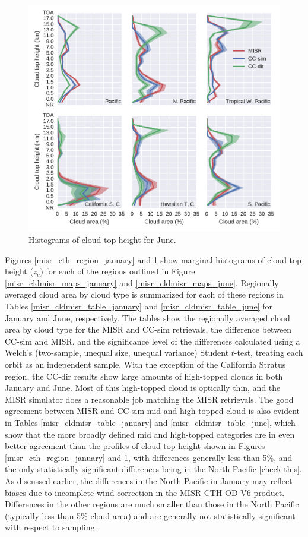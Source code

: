 \begin{figure}
\centering
\includegraphics[width=\columnwidth]{graphics/misr_cth_2008-06.pdf}
\caption{Histograms of cloud top height for June.}
\label{misr_cth_region_june}
\end{figure}

Figures \ref{misr_cth_region_january} and \ref{misr_cth_region_june} show marginal histograms of cloud top height ($z_c$) for each of the regions outlined in Figure \ref{misr_cldmisr_maps_january} and \ref{misr_cldmisr_maps_june}. Regionally averaged cloud area by cloud type is summarized for each of these regions in Tables \ref{misr_cldmisr_table_january} and \ref{misr_cldmisr_table_june} for January and June, respectively. The tables show the regionally averaged cloud area by cloud type for the MISR and CC-sim retrievals, the difference between CC-sim and MISR, and the significance level of the differences calculated using a Welch's (two-sample, unequal size, unequal variance) Student $t$-test, treating each orbit as an independent sample. With the exception of the California Stratus region, the CC-dir results show large amounts of high-topped clouds in both January and June. Most of this high-topped cloud is optically thin, and the MISR simulator does a reasonable job matching the MISR retrievals. The good agreement between MISR and CC-sim mid and high-topped cloud is also evident in Tables \ref{misr_cldmisr_table_january} and \ref{misr_cldmisr_table_june}, which show that the more broadly defined mid and high-topped categories are in even better agreement than the profiles of cloud top height shown in Figures \ref{misr_cth_region_january} and \ref{misr_cth_region_june}, with differences generally less than 5\%, and the only statistically significant differences being in the North Pacific [check this]. As discussed earlier, the differences in the North Pacific in January may reflect biases due to incomplete wind correction in the MISR CTH-OD V6 product. Differences in the other regions are much smaller than those in the North Pacific (typically less than 5\% cloud area) and are generally not statistically significant with respect to sampling.

